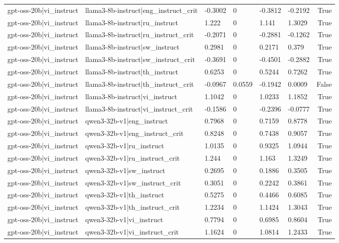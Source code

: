 \begin{table}
\begin{tabular}{llllllr}
gpt-oss-20b|vi_instruct & llama3-8b-instruct|eng_instruct_crit & -0.3002 & 0 & -0.3812 & -0.2192 & True \\
gpt-oss-20b|vi_instruct & llama3-8b-instruct|ru_instruct & 1.222 & 0 & 1.141 & 1.3029 & True \\
gpt-oss-20b|vi_instruct & llama3-8b-instruct|ru_instruct_crit & -0.2071 & 0 & -0.2881 & -0.1262 & True \\
gpt-oss-20b|vi_instruct & llama3-8b-instruct|sw_instruct & 0.2981 & 0 & 0.2171 & 0.379 & True \\
gpt-oss-20b|vi_instruct & llama3-8b-instruct|sw_instruct_crit & -0.3691 & 0 & -0.4501 & -0.2882 & True \\
gpt-oss-20b|vi_instruct & llama3-8b-instruct|th_instruct & 0.6253 & 0 & 0.5244 & 0.7262 & True \\
gpt-oss-20b|vi_instruct & llama3-8b-instruct|th_instruct_crit & -0.0967 & 0.0559 & -0.1942 & 0.0009 & False \\
gpt-oss-20b|vi_instruct & llama3-8b-instruct|vi_instruct & 1.1042 & 0 & 1.0233 & 1.1852 & True \\
gpt-oss-20b|vi_instruct & llama3-8b-instruct|vi_instruct_crit & -0.1586 & 0 & -0.2396 & -0.0777 & True \\
gpt-oss-20b|vi_instruct & qwen3-32b-v1|eng_instruct & 0.7968 & 0 & 0.7159 & 0.8778 & True \\
gpt-oss-20b|vi_instruct & qwen3-32b-v1|eng_instruct_crit & 0.8248 & 0 & 0.7438 & 0.9057 & True \\
gpt-oss-20b|vi_instruct & qwen3-32b-v1|ru_instruct & 1.0135 & 0 & 0.9325 & 1.0944 & True \\
gpt-oss-20b|vi_instruct & qwen3-32b-v1|ru_instruct_crit & 1.244 & 0 & 1.163 & 1.3249 & True \\
gpt-oss-20b|vi_instruct & qwen3-32b-v1|sw_instruct & 0.2695 & 0 & 0.1886 & 0.3505 & True \\
gpt-oss-20b|vi_instruct & qwen3-32b-v1|sw_instruct_crit & 0.3051 & 0 & 0.2242 & 0.3861 & True \\
gpt-oss-20b|vi_instruct & qwen3-32b-v1|th_instruct & 0.5275 & 0 & 0.4466 & 0.6085 & True \\
gpt-oss-20b|vi_instruct & qwen3-32b-v1|th_instruct_crit & 1.2234 & 0 & 1.1424 & 1.3043 & True \\
gpt-oss-20b|vi_instruct & qwen3-32b-v1|vi_instruct & 0.7794 & 0 & 0.6985 & 0.8604 & True \\
gpt-oss-20b|vi_instruct & qwen3-32b-v1|vi_instruct_crit & 1.1624 & 0 & 1.0814 & 1.2433 & True \\

\end{tabular}
\end{table}
